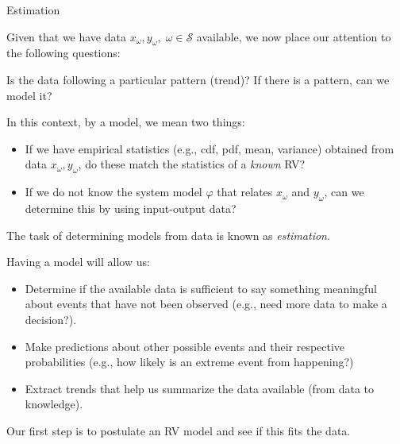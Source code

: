 \documentclass[9pt]{beamer}
\begin{document}
%
\begin{frame}{Estimation}

Given that we have data $x_\omega, y_\omega,\; \omega \in \mathcal{S}$ available, we now place our attention to the following questions:
\begin{block}{}
Is the data following a particular pattern (trend)? If there is a pattern, can we model it? 
\end{block}
In this context, by a model, we mean two things: 
\begin{itemize}
\item If we have empirical statistics (e.g., cdf, pdf, mean, variance) obtained from data $x_\omega,y_\omega$, do these match the statistics of a {\em known} RV?
\item If we do not know the system model $\varphi$ that relates $x_\omega$ and $y_\omega$, can we determine this by using input-output data? 
\end{itemize}
The task of determining models from data is known as {\em estimation}. 

Having a model will allow us:
\begin{block}{}
\begin{itemize}
\item Determine if the available data is sufficient to say something meaningful about events that have not been observed (e.g., need more data to make a decision?). 
\item Make predictions about other possible events and their respective probabilities (e.g., how likely is an extreme event from happening?)
\item Extract trends that help us summarize the data available (from data to knowledge). 
\end{itemize}
\end{block}
Our first step is to postulate an RV model and see if this fits the data. 
\end{frame}
\end{document}
